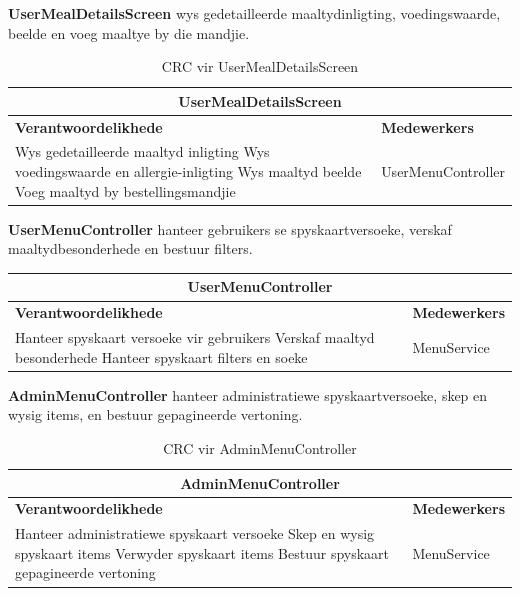 \vspace{1em}
\textbf{UserMealDetailsScreen} wys gedetailleerde maaltydinligting, voedingswaarde, beelde en voeg maaltye by die mandjie.
\begin{table}[H]\centering\begin{tabular}{|p{}|p{}|}
    \hline
    \multicolumn{2}{|c|}{\textbf{UserMealDetailsScreen}} \\
    \hline
    \textbf{Verantwoordelikhede} & \textbf{Medewerkers} \\
    \hline
    Wys gedetailleerde maaltyd inligting \newline
    Wys voedingswaarde en allergie-inligting \newline
    Wys maaltyd beelde \newline
    Voeg maaltyd by bestellingsmandjie
    &
    UserMenuController \\
    \hline
\end{tabular}
\caption{CRC vir UserMealDetailsScreen}
\label{tab:crc_user_meal_details_screen}
\end{table}

\vspace{1em}
\textbf{UserMenuController} hanteer gebruikers se spyskaartversoeke, verskaf maaltydbesonderhede en bestuur filters.
\begin{table}[H]\centering\begin{tabular}{|p{}|p{}|}
    \hline
    \multicolumn{2}{|c|}{\textbf{UserMenuController}} \\
    \hline
    \textbf{Verantwoordelikhede} & \textbf{Medewerkers} \\
    \hline
    Hanteer spyskaart versoeke vir gebruikers \newline
    Verskaf maaltyd besonderhede \newline
    Hanteer spyskaart filters en soeke
    &
    MenuService \\
    \hline
\end{tabular}\end{table}

\vspace{1em}
\textbf{AdminMenuController} hanteer administratiewe spyskaartversoeke, skep en wysig items, en bestuur gepagineerde vertoning.
\begin{table}[H]\centering\begin{tabular}{|p{}|p{}|}
    \hline
    \multicolumn{2}{|c|}{\textbf{AdminMenuController}} \\
    \hline
    \textbf{Verantwoordelikhede} & \textbf{Medewerkers} \\
    \hline
    Hanteer administratiewe spyskaart versoeke \newline
    Skep en wysig spyskaart items \newline
    Verwyder spyskaart items \newline
    Bestuur spyskaart gepagineerde vertoning
    &
    MenuService \\
    \hline
\end{tabular}
\caption{CRC vir AdminMenuController}
\label{tab:crc_admin_menu_controller}
\end{table}

